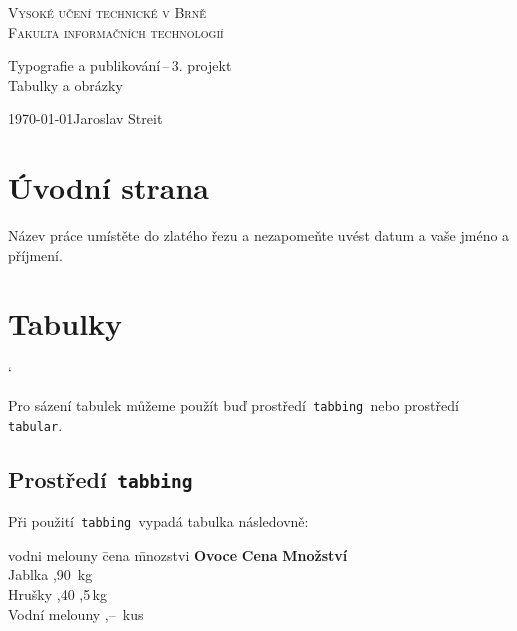 \documentclass[11pt,a4paper]{article}
\begin{document}
\begin{titlepage}
    \begin{center}
        \Huge
        \textsc{
        Vysoké učení technické v Brně\\[-0,2cm]
        \huge
        Fakulta informačních technologií}\\
        \end{center}
        \begin{center}
        \LARGE
        Typografie a publikování\,--\,3. projekt\\
        \Huge
        Tabulky a obrázky
    
    {\Large \today \hfill Jaroslav Streit}
    \end{center}
    
\end{titlepage}

\section{Úvodní strana}

Název práce umístěte do zlatého řezu a nezapomeňte uvést  datum a vaše jméno a příjmení.

\section{Tabulky}
\catcode` %

Pro sázení tabulek můžeme použít buď prostředí\verb= tabbing =nebo prostředí\verb= tabular=.

\subsection{Prostředí\texttt{ tabbing}}

Při použití\verb= tabbing =vypadá tabulka následovně:
\begin{tabbing}
vodni melouny \quad \= cena \quad\: \= mnozstvi \kill
\textbf{Ovoce} \> \textbf{Cena} \> \textbf{Množství} \\
Jablka ,90 \,kg \\
Hrušky ,40 ,5\,kg \\
Vodní melouny ,-- \,kus \\
\end{tabbing}
\end{document}
